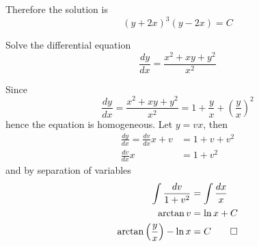 Therefore the solution is
\[(y+2x)^3(y-2x)=C\]
\begin{problem}
    Solve the differential equation
    \[\frac{dy}{dx}=\frac{x^2+xy+y^2}{x^2}\]
\end{problem}
\begin{solution}
    Since
    \[\frac{dy}{dx}=\frac{x^2+xy+y^2}{x^2}
    =1+\frac{y}{x}+\left(\frac{y}{x}\right)^2\]
    hence the equation is homogeneous.
    Let \(y=vx\), then
    \begin{align*}
        \frac{dy}{dx}=\frac{dv}{dx}x+v &= 1+v+v^2 \\
        \frac{dv}{dx}x &= 1+v^2
    \end{align*}
    and by separation of variables
    \begin{align*}
        \int\frac{dv}{1+v^2} &= \int\frac{dx}{x} \\
        \arctan v &= \ln x+C \\
        \arctan\left(\frac{y}{x}\right)-\ln x &= C \qedhere
    \end{align*}
\end{solution}